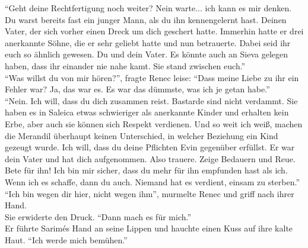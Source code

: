 ``Geht deine Rechtfertigung noch weiter? Nein warte... ich kann es mir denken. Du warst bereits 
fast ein junger Mann, als du ihn kennengelernt hast. Deinen Vater, der sich vorher einen Dreck um 
dich geschert hatte. Immerhin hatte er drei anerkannte Söhne, die er sehr geliebt hatte und nun 
betrauerte. Dabei seid ihr euch so ähnlich gewesen. Du und dein Vater. Es könnte auch an Sieva 
gelegen haben, dass ihr einander nie nahe kamt. Sie stand zwischen euch.''\\
``Was willst du von mir hören?'', fragte Renec leise: ``Dass meine Liebe zu ihr ein Fehler war? Ja, 
das war es. Es war das dümmste, was ich je getan habe.''\\
``Nein. Ich will, dass du dich zusammen reist. Bastarde sind nicht verdammt. Sie haben es in 
Saleica etwas schwieriger als anerkannte Kinder und erhalten kein Erbe, aber auch sie können sich 
Respekt verdienen. Und so weit ich weiß, machen die Merandil überhaupt keinen Unterschied, in 
welcher Beziehung ein Kind gezeugt wurde. Ich will, dass du deine Pflichten Evin gegenüber 
erfüllst. Er war dein Vater und hat dich aufgenommen. Also trauere. Zeige Bedauern und Reue. Bete 
für ihn! Ich bin mir sicher, dass du mehr für ihn empfunden hast als ich. Wenn ich es schaffe, dann 
du auch. Niemand hat es verdient, einsam zu sterben.''\\
``Ich bin wegen dir hier, nicht wegen ihm'', murmelte Renec und griff nach ihrer Hand.\\
Sie erwiderte den Druck. ``Dann mach es für mich.''\\
Er führte Sarimés Hand an seine Lippen und hauchte einen Kuss auf ihre kalte Haut. ``Ich werde mich 
bemühen.''\\


